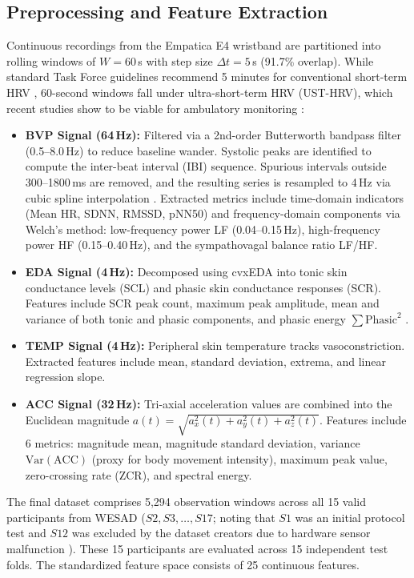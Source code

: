 \documentclass[conference]{IEEEtran}
\begin{document}
\subsection{Preprocessing and Feature Extraction}
Continuous recordings from the Empatica E4 wristband are partitioned into rolling windows of $W = 60$\,s with step size $\Delta t = 5$\,s (91.7\% overlap). While standard Task Force guidelines recommend 5 minutes for conventional short-term HRV \cite{taskforce1996heart}, 60-second windows fall under ultra-short-term HRV (UST-HRV), which recent studies show to be viable for ambulatory monitoring \cite{shaffer2017overview}:
\begin{itemize}
    \item \textbf{BVP Signal (64\,Hz):} Filtered via a 2nd-order Butterworth bandpass filter (0.5--8.0\,Hz) to reduce baseline wander. Systolic peaks are identified to compute the inter-beat interval (IBI) sequence. Spurious intervals outside 300--1800\,ms are removed, and the resulting series is resampled to 4\,Hz via cubic spline interpolation \cite{tarvainen2014kubios}. Extracted metrics include time-domain indicators (Mean HR, SDNN, RMSSD, pNN50) and frequency-domain components via Welch's method: low-frequency power LF (0.04--0.15\,Hz), high-frequency power HF (0.15--0.40\,Hz), and the sympathovagal balance ratio LF/HF.
    \item \textbf{EDA Signal (4\,Hz):} Decomposed using cvxEDA \cite{greco2016cvxeda} into tonic skin conductance levels (SCL) and phasic skin conductance responses (SCR). Features include SCR peak count, maximum peak amplitude, mean and variance of both tonic and phasic components, and phasic energy $\sum \text{Phasic}^2$ \cite{boucsein2012electrodermal}.
    \item \textbf{TEMP Signal (4\,Hz):} Peripheral skin temperature tracks vasoconstriction. Extracted features include mean, standard deviation, extrema, and linear regression slope.
    \item \textbf{ACC Signal (32\,Hz):} Tri-axial acceleration values are combined into the Euclidean magnitude $a(t) = \sqrt{a_x^2(t) + a_y^2(t) + a_z^2(t)}$. Features include 6 metrics: magnitude mean, magnitude standard deviation, variance $\text{Var}(\text{ACC})$ (proxy for body movement intensity), maximum peak value, zero-crossing rate (ZCR), and spectral energy.
\end{itemize}

The final dataset comprises 5,294 observation windows across all 15 valid participants from WESAD ($S2, S3, \dots, S17$; noting that $S1$ was an initial protocol test and $S12$ was excluded by the dataset creators due to hardware sensor malfunction \cite{schmidt2018wesad}). These 15 participants are evaluated across 15 independent test folds. The standardized feature space consists of 25 continuous features.
\end{document}
